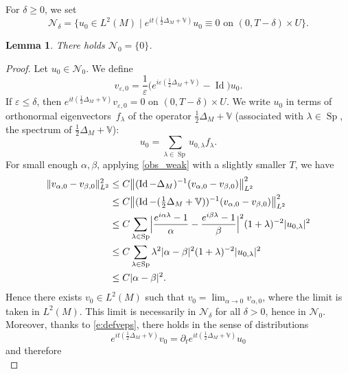 \documentclass[10pt]{amsart}
\let\mathcal\mathscr
\let\sep\mid
\let\epsilon\varepsilon
\DeclareMathOperator{\Id}{Id}
\DeclareMathOperator{\Sp}{Sp}
\theoremstyle{plain}
\newtheorem{lemma}[theorem]{Lemma}
\theoremstyle{definition}
\def\bbV{{\mathbb V}}
\begin{document}
For $\delta\geq 0$, we set
\begin{equation*}
\mathcal{N}_\delta=\bigl\{u_0\in L^2(M) \sep e^{it(\frac{1}{2}\Delta_M+\bbV)}u_0\equiv0 \text{ on } (0,T-\delta)\times U \bigr\}.
\end{equation*}
\begin{lemma} \label{l:blrlemma}
There holds $\mathcal{N}_0=\{0\}$.
\end{lemma}
\begin{proof}
Let $u_0\in \mathcal{N}_0$. We define
\begin{equation} \label{e:defveps}
v_{\epsilon,0}=\frac{1}{\epsilon}\bigl(e^{i\epsilon(\frac{1}{2}\Delta_M+\bbV)}-\Id \bigr)u_0.
\end{equation}
If $\epsilon\leq \delta$, then $e^{it(\frac{1}{2}\Delta_M+\bbV)}v_{\epsilon,0}=0$ on $(0,T-\delta)\times U$. We write $u_0$ in terms of orthonormal eigenvectors~$f_\lambda$ of the operator $\frac12\Delta_M+\bbV$ (associated with $\lambda\in \Sp$, the spectrum of $\frac12\Delta_M+\bbV$):
\begin{equation*}
u_0=\sum_{\lambda\in\Sp} u_{0,\lambda}f_\lambda.
\end{equation*}
For small enough $\alpha,\beta$, applying \eqref{obs_weak} with a slightly smaller $T$, we have
\begin{align*}
\|v_{\alpha,0}-v_{\beta,0}\|^2_{L^2}&\leq C \bigl\|(\Id-\Delta_M)^{-1}(v_{\alpha,0}-v_{\beta,0})\bigr\|^2_{L^2} \\
&\leq C \bigl\|(\Id-(\tfrac12\Delta_M+\bbV))^{-1}(v_{\alpha,0}-v_{\beta,0})\bigr\|^2_{L^2} \\
&\leq C\sum_{\lambda\in\Sp}\Bigl|\frac{e^{i\alpha\lambda}-1}{\alpha}-\frac{e^{i\beta\lambda}-1}{\beta} \Bigr |^2(1+\lambda)^{-2}|u_{0,\lambda}|^2 \\
&\leq C\sum_{\lambda\in\Sp}\lambda^2|\alpha-\beta|^2(1+\lambda)^{-2}|u_{0,\lambda}|^2 \\
&\leq C|\alpha-\beta|^2.
\end{align*}
Hence there exists $v_0\in L^2(M)$ such that $v_0=\lim_{\alpha\to 0}v_{\alpha,0}$, where the limit is taken in $L^2(M)$. This limit is necessarily in $\mathcal{N}_\delta$ for all $\delta>0$, hence in $\mathcal{N}_0$. Moreover, thanks to \eqref{e:defveps}, there holds in the sense of distributions
\begin{equation*}
e^{it(\frac{1}{2}\Delta_M+\bbV)}v_0=\partial_te^{it(\frac{1}{2}\Delta_M+\bbV)}u_0
\end{equation*}
and therefore
\begin{equation*}

\end{equation*}
\end{proof}
\end{document}
